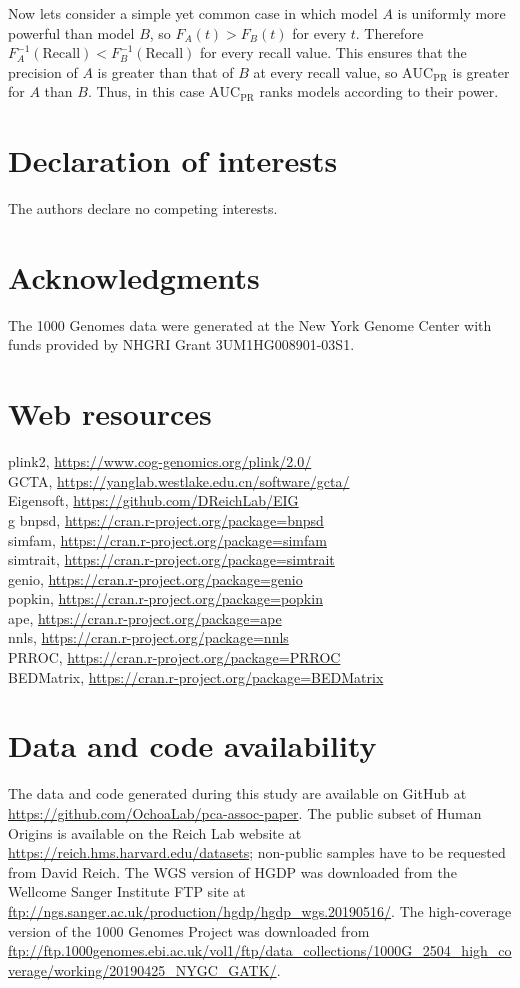\documentclass[11pt]{article}
\newcommand{\auc}{\text{AUC}_\text{PR}}
\begin{document}
Now lets consider a simple yet common case in which model $A$ is uniformly more powerful than model $B$, so $F_A(t) > F_B(t)$ for every $t$.
Therefore $F_A^{-1}( \text{Recall} ) < F_B^{-1}( \text{Recall} )$ for every recall value.
This ensures that the precision of $A$ is greater than that of $B$ at every recall value, so $\auc$ is greater for $A$ than $B$.
Thus, in this case $\auc$ ranks models according to their power.


\section*{Declaration of interests}
The authors declare no competing interests.

\section*{Acknowledgments}
The 1000 Genomes data were generated at the New York Genome Center with funds provided by NHGRI Grant 3UM1HG008901-03S1.

\section*{Web resources}
plink2, \url{https://www.cog-genomics.org/plink/2.0/}\\
GCTA, \url{https://yanglab.westlake.edu.cn/software/gcta/}\\
Eigensoft, \url{https://github.com/DReichLab/EIG}\\g
bnpsd, \url{https://cran.r-project.org/package=bnpsd}\\
simfam, \url{https://cran.r-project.org/package=simfam}\\
simtrait, \url{https://cran.r-project.org/package=simtrait}\\
genio, \url{https://cran.r-project.org/package=genio}\\
popkin, \url{https://cran.r-project.org/package=popkin}\\
ape, \url{https://cran.r-project.org/package=ape}\\
nnls, \url{https://cran.r-project.org/package=nnls}\\
PRROC, \url{https://cran.r-project.org/package=PRROC}\\
BEDMatrix, \url{https://cran.r-project.org/package=BEDMatrix}

\section*{Data and code availability}
The data and code generated during this study are available on GitHub at \url{https://github.com/OchoaLab/pca-assoc-paper}.
The public subset of Human Origins is available on the Reich Lab website at \url{https://reich.hms.harvard.edu/datasets}; non-public samples have to be requested from David Reich.
The WGS version of HGDP was downloaded from the Wellcome Sanger Institute FTP site at \url{ftp://ngs.sanger.ac.uk/production/hgdp/hgdp_wgs.20190516/}.
The high-coverage version of the 1000 Genomes Project was downloaded from \url{ftp://ftp.1000genomes.ebi.ac.uk/vol1/ftp/data_collections/1000G_2504_high_coverage/working/20190425_NYGC_GATK/}.
\end{document}
